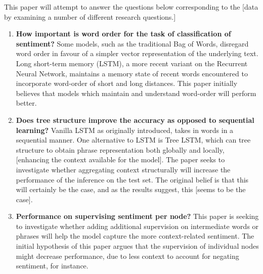 This paper will attempt to answer the questions below corresponding to the
[data by examining a number of different research questions.]
\begin{enumerate}
    \item \textbf{How important is word order for the task of classification of
    sentiment?} Some models, such as the traditional Bag of Words, disregard
    word order in favour of a simpler vector representation of the underlying
    text. Long short-term memory (LSTM), a more recent variant on the Recurrent
    Neural Network, maintains a memory state of recent words encountered to
    incorporate word-order of short and long distances. This paper initially
    believes that models which maintain and understand word-order will perform
    better. 
    \item \textbf{Does tree structure improve the accuracy as opposed to
    sequential learning?} Vanilla LSTM as originally introduced, takes in words
    in a sequential manner. One alternative to LSTM is Tree LSTM, which can tree
    structure to obtain phrase representation both globally and locally,
    [enhancing the context available for the model]. The paper seeks to
    investigate whether aggregating context structurally will increase the
    performance of the inference on the test set. The original belief is that
    this will certainly be the case, and as the results suggest, this [seems to
    be the case].
    \item \textbf{Performance on supervising sentiment per node?}
    This paper is seeking to investigate whether adding additional supervision
    on intermediate words or phrases will help the model capture the more
    context-related sentiment. The initial hypothesis of this paper argues that
    the supervision of individual nodes might decrease performance, due to less
    context to account for negating sentiment, for instance.

\end{enumerate}
